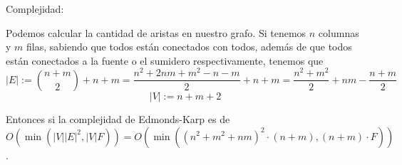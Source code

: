 \documentclass{article}
\begin{document}
Complejidad:

Podemos calcular la cantidad de aristas en nuestro grafo. Si tenemos $n$ columnas y $m$ filas, sabiendo que todos están conectados con todos, además de que todos están conectados a la fuente o el sumidero respectivamente, tenemos que
\[
|E| := \binom{n+m}{2} + n + m = \frac{n^2 + 2nm + m^2 - n - m}{2} + n + m = \frac{n^2 + m^2}{2} + nm - \frac{n + m}{2}
\]
\[
|V| := n + m + 2
\]

Entonces si la complejidad de Edmonds-Karp es de \\ 
$O(\min(|V||E|^2, |V|F)) = O\left(\min \left( (n^2 + m^2 + nm)^2 \cdot (n+m), (n+m) \cdot F \right)\right)$.
\end{document}
